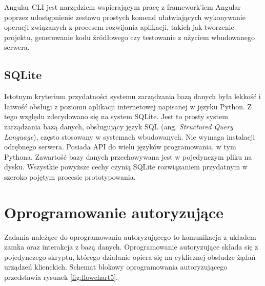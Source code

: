     	    Angular CLI jest narzędziem wspierającym pracę z framework'iem Angular poprzez udostępnienie zestawu prostych komend ułatwiających wykonywanie operacji związanych z procesem rozwijania aplikacji, takich jak tworzenie projektu, generowanie kodu źródłowego czy testowanie z użyciem wbudowanego serwera.

    	\subsection{SQLite}
    	\label{s:db}

    		Istotnym kryterium przydatności systemu zarządzania bazą danych była lekkość i łatwość obsługi z poziomu aplikacji internetowej napisanej w języku Python. Z tego względu zdecydowano się na system SQLite. Jest to prosty system zarządzania bazą danych, obsługujący język SQL (ang. \textit{Structured Query Language}), często stosowany w systemach wbudowanych. Nie wymaga instalacji odrębnego serwera. Posiada API do wielu języków programowania, w tym Pythona. Zawartość bazy danych przechowywana jest w pojedynczym pliku na dysku. Wszystkie powyższe cechy czynią SQLite rozwiązaniem przydatnym w szeroko pojętym procesie prototypowania.


    \section{Oprogramowanie autoryzujące}
    \label{s:auth_subs}

		Zadania należące do oprogramowania autoryzującego to komunikacja z układem zamka oraz interakcja z bazą danych. 
    	Oprogramowanie autoryzujące składa się z pojedynczego skryptu, którego działanie opiera się na cyklicznej obsłudze żądań urządzeń klienckich. Schemat blokowy oprogramowania autoryzującego przedstawia rysunek \ref{fig:flowchart5}.


